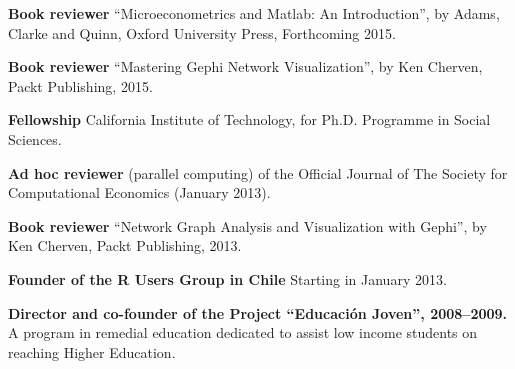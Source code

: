 \documentclass[letterpaper, 11pt]{article}
\def\footerlink{http://its.caltech.edu/$\sim$gvegayon}
\renewenvironment{itemize}{
  \begin{list}{}{
    \setlength{\leftmargin}{0.45cm}
  }
}{
  \end{list}
}
\begin{document}
\begin{itemize}
\item \textbf{Book reviewer} ``Microeconometrics and Matlab: An Introduction'', by Adams, Clarke and Quinn, Oxford University Press, Forthcoming 2015.
\item \textbf{Book reviewer} ``Mastering Gephi Network Visualization'', by Ken Cherven, Packt Publishing, 2015.
\item \textbf{Fellowship} California Institute of Technology, for Ph.D. Programme in Social Sciences.
\item \textbf{Ad hoc reviewer} (parallel computing) of the Official Journal of The Society for Computational Economics (January 2013).
\item \textbf{Book reviewer} ``Network Graph Analysis and Visualization with Gephi'', by Ken Cherven, Packt Publishing, 2013.
\item \textbf{Founder of the R Users Group in Chile} Starting in January 2013.
\item \textbf{Director and co-founder of the Project ``Educaci\'on Joven'', 2008--2009.} A program in remedial education
 dedicated to assist low income students on reaching Higher Education.
\end{itemize}


\end{document}
